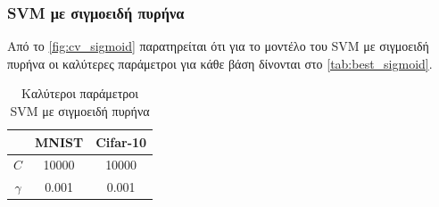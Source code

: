 \documentclass[a4paper]{article}
\begin{document}
\subsubsection{SVM με σιγμοειδή πυρήνα}

Από το \autoref{fig:cv_sigmoid} παρατηρείται ότι για το μοντέλο του SVM με
σιγμοειδή πυρήνα οι καλύτερες παράμετροι για κάθε βάση δίνονται στο
\autoref{tab:best_sigmoid}.

\begin{table}[h]
\centering
\begin{tabular}{|c|c|c|}
\hline
         & MNIST & Cifar-10 \\ \hline
$C$      & 10000 & 10000    \\ \hline
$\gamma$ & 0.001 & 0.001    \\ \hline
\end{tabular}
\caption{Καλύτεροι παράμετροι SVM με σιγμοειδή πυρήνα}
\label{tab:best_sigmoid}
\end{table}
\end{document}
